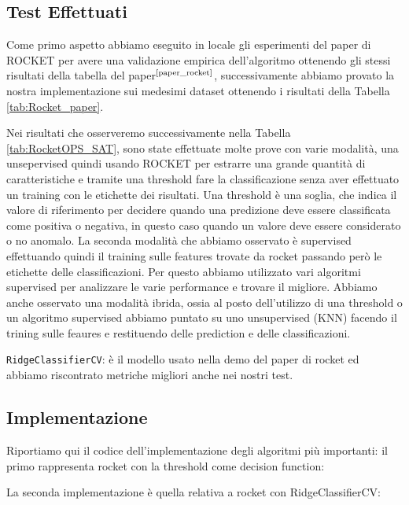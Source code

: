 \subsection{Test Effettuati}
Come primo aspetto abbiamo eseguito in locale gli esperimenti del paper di ROCKET per avere una validazione empirica dell'algoritmo ottenendo gli stessi risultati della tabella del paper$^{\text{\cite{paper_rocket}}}$, successivamente abbiamo provato la nostra implementazione sui medesimi dataset ottenendo i risultati della Tabella \ref{tab:Rocket_paper}.

\pagebreak
Nei risultati che osserveremo successivamente nella Tabella \ref{tab:RocketOPS_SAT}, sono state effettuate molte prove con varie modalità, una unsepervised quindi usando ROCKET per estrarre una grande quantità di caratteristiche e tramite una threshold fare la classificazione senza aver effettuato un training con le etichette dei risultati.
Una threshold è una soglia, che indica il valore di riferimento per decidere quando una predizione deve essere classificata come positiva  o negativa, in questo caso quando un valore deve essere considerato o no anomalo.
La seconda modalità che abbiamo osservato è supervised effettuando quindi il training sulle features trovate da rocket passando però le etichette delle classificazioni.
Per questo abbiamo utilizzato vari algoritmi supervised per analizzare le varie performance e trovare il migliore.
Abbiamo anche osservato una modalità ibrida, ossia al posto dell'utilizzo di una threshold o un algoritmo supervised abbiamo puntato su uno unsupervised (KNN) facendo il trining sulle feaures e restituendo delle prediction e delle classificazioni.

\texttt{RidgeClassifierCV}: è il modello usato nella demo del paper di rocket ed abbiamo riscontrato metriche migliori anche nei nostri test.


\pagebreak

\subsection{Implementazione}

Riportiamo qui il codice dell'implementazione degli algoritmi più importanti:
il primo rappresenta rocket con la threshold come decision function:

La seconda implementazione è quella relativa a rocket con RidgeClassifierCV:


